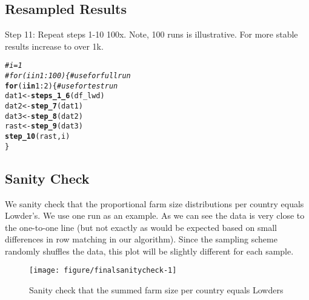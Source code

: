 \documentclass{article}\usepackage[]{graphicx}\usepackage[]{xcolor}
\makeatletter
\newcommand{\hlnum}[1]{\textcolor[rgb]{0.686,0.059,0.569}{#1}}%
\newcommand{\hlcom}[1]{\textcolor[rgb]{0.678,0.584,0.686}{\textit{#1}}}%
\newcommand{\hlopt}[1]{\textcolor[rgb]{0,0,0}{#1}}%
\newcommand{\hlstd}[1]{\textcolor[rgb]{0.345,0.345,0.345}{#1}}%
\newcommand{\hlkwa}[1]{\textcolor[rgb]{0.161,0.373,0.58}{\textbf{#1}}}%
\newcommand{\hlkwb}[1]{\textcolor[rgb]{0.69,0.353,0.396}{#1}}%
\newcommand{\hlkwd}[1]{\textcolor[rgb]{0.737,0.353,0.396}{\textbf{#1}}}%
\newenvironment{kframe}{%
 \def\at@end@of@kframe{}%
 \ifinner\ifhmode%
  \def\at@end@of@kframe{\end{minipage}}%
  \begin{minipage}{\columnwidth}%
 \fi\fi%
 \def\FrameCommand##1{\hskip\@totalleftmargin \hskip-\fboxsep
 \colorbox{shadecolor}{##1}\hskip-\fboxsep
     \hskip-\linewidth \hskip-\@totalleftmargin \hskip\columnwidth}%
 \MakeFramed {\advance\hsize-\width
   \@totalleftmargin\z@ \linewidth\hsize
   \@setminipage}}%
 {\par\unskip\endMakeFramed%
 \at@end@of@kframe}
\newenvironment{knitrout}{}{} %
\makeatother
\begin{document}
\subsection{Resampled Results}


Step 11: Repeat steps 1-10 100x. Note, 100 runs is illustrative. For more stable results increase to over 1k.

\begin{knitrout}
\color{fgcolor}\begin{kframe}
\begin{alltt}
\hlcom{# i = 1}
\hlcom{# for (i in 1:100) \{  # use for full run}
\hlkwa{for} \hlstd{(i} \hlkwa{in} \hlnum{1}\hlopt{:}\hlnum{2}\hlstd{) \{}      \hlcom{# use for test run}
  \hlstd{dat1} \hlkwb{<-} \hlkwd{steps_1_6}\hlstd{(df_lwd)}
  \hlstd{dat2} \hlkwb{<-} \hlkwd{step_7}\hlstd{(dat1)}
  \hlstd{dat3} \hlkwb{<-} \hlkwd{step_8}\hlstd{(dat2)}
  \hlstd{rast} \hlkwb{<-} \hlkwd{step_9}\hlstd{(dat3)}
  \hlkwd{step_10}\hlstd{(rast, i)}
\hlstd{\}}
\end{alltt}
\end{kframe}
\end{knitrout}


\subsection{Sanity Check}

We sanity check that the proportional farm size distributions per country equals Lowder’s. We use one run as an example. As we can see the data is very close to the one-to-one line (but not exactly as would be expected based on small differences in row matching in our algorithm). Since the sampling scheme randomly shuffles the data, this plot will be slightly different for each sample.

\begin{knitrout}\footnotesize
{}\color{fgcolor}\begin{figure}[H]

{\centering \texttt{[image: figure/finalsanitycheck-1]} 

}

\caption[Sanity check that the summed farm size per country equals Lowders]{Sanity check that the summed farm size per country equals Lowders}\label{fig:finalsanitycheck}
\end{figure}

\end{knitrout}
\end{document}
